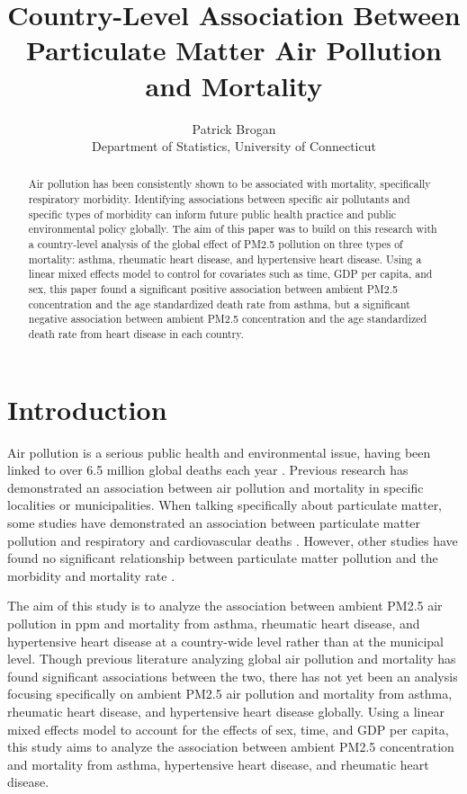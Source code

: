 \documentclass[12pt, letterpaper, twoside]{article}
\title{Country-Level Association Between Particulate Matter Air Pollution and Mortality}
\author{Patrick Brogan\\[1ex]
  Department of Statistics, University of Connecticut\\}
\begin{document}
\maketitle

\begin{abstract}
Air pollution has been consistently shown to be associated with mortality,
specifically respiratory morbidity. Identifying associations between specific
air pollutants and specific types of morbidity can inform future public health
practice and public environmental policy globally. The aim of this paper was to
build on this research with a country-level analysis of the global effect of
PM2.5 pollution on three types of mortality: asthma, rheumatic heart disease,
and hypertensive heart disease. Using a linear mixed effects model to control
for covariates such as time, GDP per capita, and sex, this paper found a
significant positive association between ambient PM2.5 concentration and the age
standardized death rate from asthma, but a significant negative association
between ambient PM2.5 concentration and the age standardized death rate from
heart disease in each country.
\end{abstract}

\section*{Introduction}
Air pollution is a serious public health and environmental issue, having been
linked to over 6.5 million global deaths each year \citep{fuller2022pollution}.
Previous research has demonstrated an association between air pollution and
mortality in specific localities or municipalities\citep{dockery1993association,
sunyer1996air, jerrett2005spatial, analitis2006short}. When talking specifically
about particulate matter, some studies have demonstrated an association between
particulate matter pollution and respiratory and cardiovascular deaths
\citep{analitis2006short}. However, other studies have found no significant
relationship between particulate matter pollution and the morbidity and
mortality rate \citep{khojasteh2021long}.\par

The aim of this study is to analyze
the association between ambient PM2.5 air pollution in ppm and mortality from
asthma, rheumatic heart disease, and hypertensive heart disease at a country-wide
level rather than at the municipal level. Though previous literature analyzing
global air pollution and mortality has found significant associations between
the two, there has not yet been an analysis focusing specifically on ambient
PM2.5 air pollution and mortality from asthma, rheumatic heart disease, and
hypertensive heart disease globally. Using a linear mixed effects model to
account for the effects of sex, time, and GDP per capita, this study aims to
analyze the association between ambient PM2.5 concentration and mortality from
asthma, hypertensive heart disease, and rheumatic heart disease.
\end{document}
